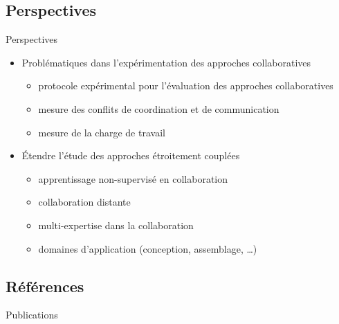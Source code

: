 \documentclass[english,french,dvips,10pt]{mybeamer}
\begin{document}
	\subsection{Perspectives}
	\begin{myframe}{Perspectives}
		\begin{itemize}
				\vfill
			\item Problématiques dans l'expérimentation des approches collaboratives
				\begin{itemize}
					\item protocole expérimental pour l'évaluation des approches collaboratives
					\item mesure des conflits de coordination et de communication
					\item mesure de la charge de travail
				\end{itemize}
				\vfill
			\item Étendre l'étude des approches étroitement couplées
				\begin{itemize}
					\item apprentissage non-supervisé en collaboration
					\item collaboration distante
					\item multi-expertise dans la collaboration
					\item domaines d'application (conception, assemblage, \dots)
				\end{itemize}
				\vfill
		\end{itemize}
	\end{myframe}
	\subsection{Références}
	\nocite{Simard-2009}
	\nocite{Simard-2010a}
	\nocite{Simard-2010b}
	\nocite{Simard-2010c}
	\nocite{Simard-2011a}
	\nocite{Simard-2011b}
	\nocite{Simard-2012a}
	\nocite{Simard-2012b}
	\nocite{Simard-2012c}
	\nocite{Girard-2012a}
	\nocite{Girard-2012b}
	\begin{myframe}{Publications}
		\printbibliography[type=article,category=myrefs]
		\printbibliography[type=inproceedings,category=myrefs]
	\end{myframe}
	\appendix
\end{document}
